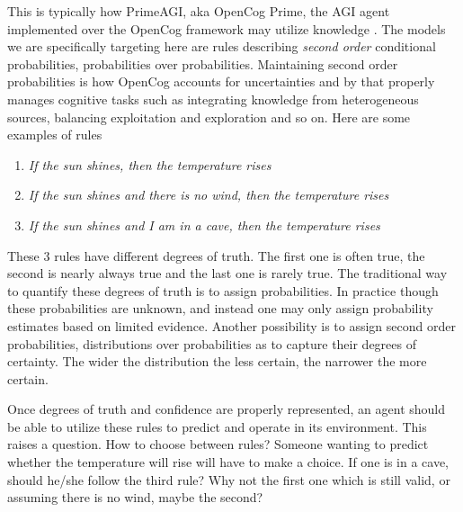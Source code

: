 \documentclass[runningheads]{llncs}
\begin{document}
This is typically how PrimeAGI, aka OpenCog Prime, the AGI agent
implemented over the OpenCog framework may utilize knowledge
\cite{Goertzel15Speculative}. The models we are specifically targeting
here are rules describing \emph{second order} conditional
probabilities, probabilities over probabilities. Maintaining second
order probabilities is how OpenCog accounts for uncertainties
\cite{Ikle08Probabilistic} and by that properly manages cognitive
tasks such as integrating knowledge from heterogeneous sources,
balancing exploitation and exploration and so on.
Here are some examples of rules
\begin{enumerate}
\item {\it If the sun shines, then the temperature rises}
\item {\it If the sun shines and there is no wind, then the temperature rises}
\item {\it If the sun shines and I am in a cave, then the temperature
    rises}
\end{enumerate}

These 3 rules have different degrees of truth. The first one is often
true, the second is nearly always true and the last one is rarely
true. The traditional way to quantify these degrees of truth is to
assign probabilities. In practice though these probabilities are
unknown, and instead one may only assign probability estimates based
on limited evidence. Another possibility is to assign second order
probabilities, distributions over probabilities as to capture their
degrees of certainty. The wider the distribution the less certain, the
narrower the more certain.





Once degrees of truth and confidence are properly represented, an
agent should be able to utilize these rules to predict and operate in
its environment. This raises a question. How to choose between rules?
Someone wanting to predict whether the temperature will rise will have
to make a choice. If one is in a cave, should he/she follow the third
rule? Why not the first one which is still valid, or assuming there is
no wind, maybe the second?
\end{document}
